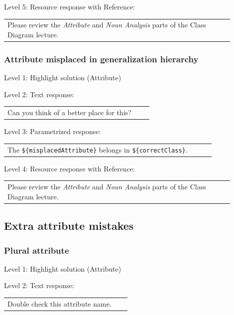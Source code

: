 \noindent Level 5: Resource response with Reference: \medskip

\begin{tabular}{|p{0.9\linewidth}}
Please review the \textit{Attribute} and \textit{Noun Analysis} parts of the Class Diagram lecture.
\end{tabular} \medskip


\subsubsection{Attribute misplaced in generalization hierarchy}

\noindent Level 1: Highlight solution (Attribute) \medskip

\noindent Level 2: Text response: \medskip

\begin{tabular}{|p{0.9\linewidth}}
Can you think of a better place for this?
\end{tabular} \medskip

\noindent Level 3: Parametrized response: \medskip

\begin{tabular}{|p{0.9\linewidth}}
The \verb|${misplacedAttribute}| belongs in \verb|${correctClass}|.
\end{tabular} \medskip

\noindent Level 4: Resource response with Reference: \medskip

\begin{tabular}{|p{0.9\linewidth}}
Please review the \textit{Attribute} and \textit{Noun Analysis} parts of the Class Diagram lecture.
\end{tabular} \medskip


\subsection{Extra attribute mistakes}

\subsubsection{Plural attribute}

\noindent Level 1: Highlight solution (Attribute) \medskip

\noindent Level 2: Text response: \medskip

\begin{tabular}{|p{0.9\linewidth}}
Double check this attribute name.
\end{tabular} \medskip

